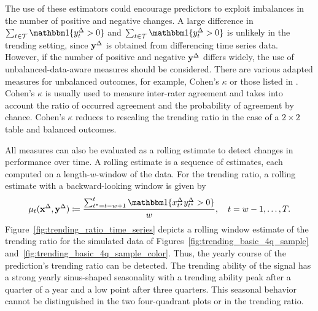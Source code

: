 The use of these estimators could encourage predictors to exploit imbalances in the number of positive and negative changes. 
A large difference in $\sum_{t \in \mathcal{T}} \ind{\diffyt > 0}$ and $\sum_{t \in \mathcal{T}} \ind{\diffyt > 0}$ is unlikely in the trending setting, since $\mathbf{y}^{\Delta}$ is obtained from differencing time series data. 
However, if the number of positive and negative $\mathbf{y}^{\Delta}$ differs widely, the use of unbalanced-data-aware measures should be considered.
There are various adapted measures for unbalanced outcomes, for example, Cohen's $\kappa$ \parencite{Cohen1960} or those listed in \textcite[Table 3.3]{Jolliffe2012}.
Cohen's $\kappa$ is usually used to measure inter-rater agreement and takes into account the ratio of occurred agreement and the probability of agreement by chance.
Cohen's $\kappa$ reduces to rescaling the trending ratio in the case of a $2\times2$ table and balanced outcomes.

All measures can also be evaluated as a rolling estimate to detect changes in performance over time.
A rolling estimate is a sequence of estimates, each computed on a length-$w$-window of the data.
For the trending ratio, a rolling estimate with a backward-looking window is given by
\begin{equation*}
    \acc_t (\diffx, \diffy) \coloneqq \frac{\sum_{t^\star = t-w + 1}^{t} \ind{\diffxt[t^\star] \diffyt[t^\star] > 0}}{w}, \quad t = w-1, \dots, T.\label{eq:acc_rolling}
\end{equation*}
Figure~\ref{fig:trending_ratio_time_series} depicts a rolling window estimate of the trending ratio for the simulated data of Figures~\ref{fig:trending_basic_4q_sample} and~\ref{fig:trending_basic_4q_sample_color}.
Thus, the yearly course of the prediction's trending ratio can be detected.
The trending ability of the signal has a strong yearly sinus-shaped seasonality with a trending ability peak after a quarter of a year and a low point after three quarters.
This seasonal behavior cannot be distinguished in the two four-quadrant plots or in the trending ratio.


